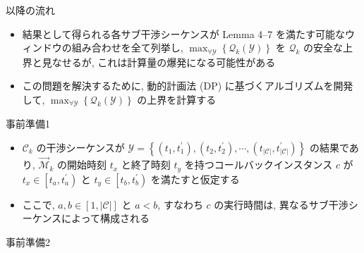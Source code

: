 \begin{frame}{以降の流れ}
    \begin{itemize}
        \item 結果として得られる各サブ干渉シーケンスが Lemma 4--7 を満たす可能なウィンドウの組み合わせを全て列挙し, $\max _{\forall \mathcal{Y}}\left\{\mathcal{Q}_{k}(\mathcal{Y})\right\}$ を $\mathcal{Q}_{k}$ の安全な上界と見なせるが, これは計算量の爆発になる可能性がある
        \item この問題を解決するために, 動的計画法 (DP) に基づくアルゴリズムを開発して, $\max _{\forall \mathcal{Y}}\left\{\mathcal{Q}_{k}(\mathcal{Y})\right\}$ の上界を計算する
    \end{itemize}
\end{frame}

\begin{frame}{事前準備1}
    \begin{itemize}
        \item $\mathcal{C}_{k}$ の干渉シーケンスが $\mathcal{Y}=\left\{\left(t_{1}, t_{1}^{\prime}\right),\left(t_{2}, t_{2}^{\prime}\right), \cdots,\left(t_{|\mathcal{C}|}, t_{|\mathcal{C}|}^{\prime}\right)\right\}$ の結果であり, $\overrightarrow{\mathcal{M}}_{k}$ の開始時刻 $t_{x}$ と終了時刻 $t_{y}$ を持つコールバックインスタンス $c$ が $t_{x} \in\left[t_{a}, t_{a}^{\prime}\right)$ と $t_{y} \in\left[t_{b}, t_{b}^{\prime}\right)$ を満たすと仮定する
        \item ここで, $a, b \in[1,|\mathcal{C}|]$ と $a<b$, すなわち $c$ の実行時間は, 異なるサブ干渉シーケンスによって構成される
    \end{itemize}
\end{frame}

\begin{frame}{事前準備2}
\end{frame}

